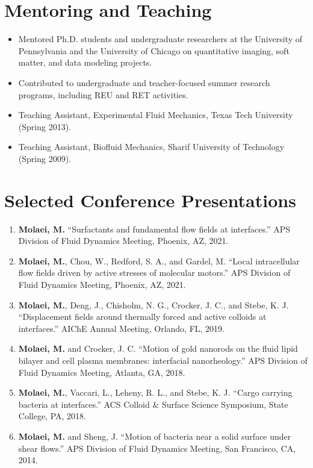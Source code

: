 \documentclass[11pt]{article}
\newlength{\cvindent}
\newenvironment{cvblock}{%
  \begin{list}{}{%
    \setlength{\leftmargin}{\cvindent}%
    \setlength{\rightmargin}{0pt}%
    \setlength{\labelwidth}{0pt}%
    \setlength{\labelsep}{0pt}%
    \setlength{\itemindent}{0pt}%
    \setlength{\listparindent}{0pt}%
    \setlength{\topsep}{0pt}%
    \setlength{\partopsep}{0pt}%
    \setlength{\parsep}{0pt}%
    \setlength{\itemsep}{0pt}%
  }
  \item[]
}{%
  \end{list}
}
\newcommand{\pubitem}[1]{\item #1}
\begin{document}
\section*{Mentoring and Teaching}
\begin{cvblock}
\begin{itemize}
    \item Mentored Ph.D. students and undergraduate researchers at the University of Pennsylvania and the University of Chicago on quantitative imaging, soft matter, and data modeling projects.
    \item Contributed to undergraduate and teacher-focused summer research programs, including REU and RET activities.
    \item Teaching Assistant, Experimental Fluid Mechanics, Texas Tech University (Spring 2013).
    \item Teaching Assistant, Biofluid Mechanics, Sharif University of Technology (Spring 2009).
\end{itemize}
\end{cvblock}

\section*{Selected Conference Presentations}
\begin{cvblock}
\begin{enumerate}
    \pubitem{\textbf{Molaei, M.} ``Surfactants and fundamental flow fields at interfaces.'' APS Division of Fluid Dynamics Meeting, Phoenix, AZ, 2021.}
    \pubitem{\textbf{Molaei, M.}, Chou, W., Redford, S. A., and Gardel, M. ``Local intracellular flow fields driven by active stresses of molecular motors.'' APS Division of Fluid Dynamics Meeting, Phoenix, AZ, 2021.}
    \pubitem{\textbf{Molaei, M.}, Deng, J., Chisholm, N. G., Crocker, J. C., and Stebe, K. J. ``Displacement fields around thermally forced and active colloids at interfaces.'' AIChE Annual Meeting, Orlando, FL, 2019.}
    \pubitem{\textbf{Molaei, M.} and Crocker, J. C. ``Motion of gold nanorods on the fluid lipid bilayer and cell plasma membranes: interfacial nanorheology.'' APS Division of Fluid Dynamics Meeting, Atlanta, GA, 2018.}
    \pubitem{\textbf{Molaei, M.}, Vaccari, L., Leheny, R. L., and Stebe, K. J. ``Cargo carrying bacteria at interfaces.'' ACS Colloid \& Surface Science Symposium, State College, PA, 2018.}
    \pubitem{\textbf{Molaei, M.} and Sheng, J. ``Motion of bacteria near a solid surface under shear flows.'' APS Division of Fluid Dynamics Meeting, San Francisco, CA, 2014.}
\end{enumerate}
\end{cvblock}
\end{document}
